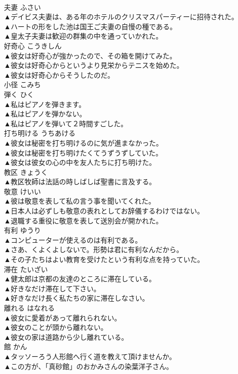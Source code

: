 \documentclass[8pt]{extreport}
\begin{document}
\begin{CJK}{UTF8}{min}
\\	夫妻	ふさい	
\\	▲デイビス夫妻は、ある年のホテルのクリスマスパーティーに招待された。 
\\	▲ハートの形をした池は国王ご夫妻の自慢の種である。 
\\	▲皇太子夫妻は歓迎の群集の中を通っていかれた。 
\\	好奇心	こうきしん	
\\	▲彼女は好奇心が強かったので、その箱を開けてみた。 
\\	▲彼女は好奇心からというより見栄からテニスを始めた。 
\\	▲彼女は好奇心からそうしたのだ。 
\\	小径	こみち	
\\	弾く	ひく	
\\	▲私はピアノを弾きます。 
\\	▲私はピアノを弾かない。 
\\	▲私はピアノを弾いて２時間すごした。 
\\	打ち明ける	うちあける	
\\	▲彼女は秘密を打ち明けるのに気が進まなかった。 
\\	▲彼女は秘密を打ち明けたくてうずうずしていた。 
\\	▲彼女は彼女の心の中を友人たちに打ち明けた。 
\\	教区	きょうく	
\\	▲教区牧師は法話の時しばしば聖書に言及する。 
\\	敬意	けいい	
\\	▲彼は敬意を表して私の言う事を聞いてくれた。 
\\	▲日本人は必ずしも敬意の表れとしてお辞儀するわけではない。 
\\	▲退職する重役に敬意を表して送別会が開かれた。 
\\	有利	ゆうり	
\\	▲コンピューターが使えるのは有利である。 
\\	▲さあ、くよくよしないで。形勢は君に有利なんだから。 
\\	▲その子たちはよい教育を受けたという有利な点を持っていた。 
\\	滞在	たいざい	
\\	▲健太郎は京都の友達のところに滞在している。 
\\	▲好きなだけ滞在して下さい。 
\\	▲好きなだけ長く私たちの家に滞在しなさい。 
\\	離れる	はなれる	
\\	▲彼女に愛着があって離れられない。 
\\	▲彼女のことが頭から離れない。 
\\	▲彼女の家は道路から少し離れている。 
\\	館	かん	
\\	▲タッソーろう人形館へ行く道を教えて頂けませんか。 
\\	▲この方が、「真砂館」のおかみさんの染葉洋子さん。 
\end{CJK}
\end{document}
